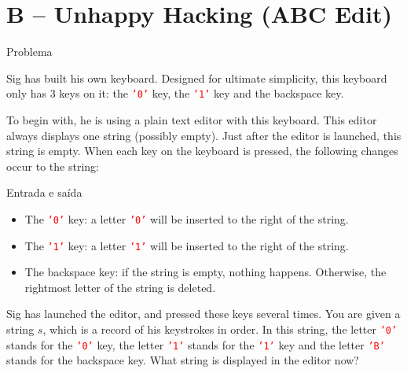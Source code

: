 \section{B -- Unhappy Hacking (ABC Edit)}

\begin{frame}[fragile]{Problema}

Sig has built his own keyboard. Designed for ultimate simplicity, this keyboard only has 3 keys on
it: the \texttt{\textcolor{red}{'0'}} key, the \texttt{\textcolor{red}{'1'}} key and the backspace
key.

To begin with, he is using a plain text editor with this keyboard. This editor always displays one
string (possibly empty). Just after the editor is launched, this string is empty. When each key on
the keyboard is pressed, the following changes occur to the string:

\end{frame}

\begin{frame}[fragile]{Entrada e saída}

\begin{itemize}
    \item The \texttt{\textcolor{red}{'0'}} key: a letter \texttt{\textcolor{red}{'0'}} will be
        inserted to the right of the string.
    \item The \texttt{\textcolor{red}{'1'}} key: a letter \texttt{\textcolor{red}{'1'}} will be
        inserted to the right of the string.
    \item The backspace key: if the string is empty, nothing happens. Otherwise, the rightmost
        letter of the string is deleted.
\end{itemize}

Sig has launched the editor, and pressed these keys several times. You are given a string $s$,
which is a record of his keystrokes in order. In this string, the letter
\texttt{\textcolor{red}{'0'}} stands for the \texttt{\textcolor{red}{'0'}} key, the letter
\texttt{\textcolor{red}{'1'}} stands for the \texttt{\textcolor{red}{'1'}} key and the letter
\texttt{\textcolor{red}{'B'}} stands for the backspace key. What string is displayed in the editor
now?

\end{frame}

